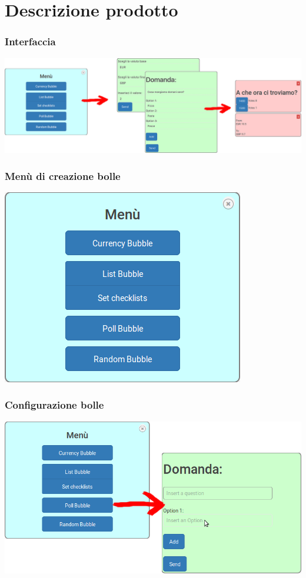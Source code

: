 \section{Descrizione prodotto}


\begin{frame}
	\frametitle{Interfaccia}
	\includegraphics[scale=0.50]{img/interf.png}
	
\end{frame}
\begin{frame}
	\frametitle{Menù di creazione bolle}
	\includegraphics[scale=0.50]{img/menu.png}
	
\end{frame}


\begin{frame}
	\frametitle{Configurazione bolle}
	\includegraphics[scale=0.35]{img/config.png}
\end{frame}


